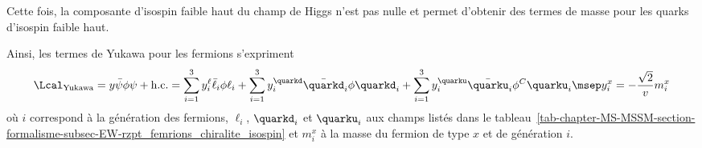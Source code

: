 Cette fois, la composante d'isospin faible haut du champ de Higgs n'est pas nulle et permet d'obtenir des termes de masse pour les quarks d'isospin faible haut.
\par Ainsi, les termes de Yukawa pour les fermions s'expriment
\begin{equation}
\Lcal_\text{Yukawa}
=
y \bar{\psi} \phi \psi + \text{h.c.}
=
\sum_{i=1}^3 y_i^\ell \bar{\ell}_i \phi \ell_i
+ \sum_{i=1}^3 y_i^\quarkd \bar{\quarkd}_i \phi \quarkd_i
+ \sum_{i=1}^3 y_i^\quarku \bar{\quarku}_i \phi^C \quarku_i
\msep
y_i^x = -\frac{\sqrt{2}}{v}m_i^x
\label{eq-chapter-MS-MSSM-section-formalisme-subsec-Higgs_mechanism-subsubsec-fermions-Yukawa_couplings}
\end{equation}
où
$i$ correspond à la génération des fermions,
$\ell_i$, $\quarkd_i$ et $\quarku_i$ aux champs listés dans le tableau~\ref{tab-chapter-MS-MSSM-section-formalisme-subsec-EW-rzpt_femrions_chiralite_isospin}
et
$m_i^x$ à la masse du fermion de type $x$ et de génération $i$.
